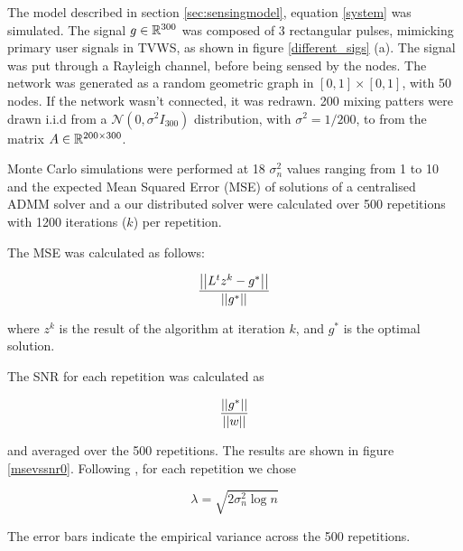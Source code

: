 The model described in section \eqref{sec:sensingmodel}, equation \eqref{system} was simulated. The signal \(g \in {\mathbb{R}}^{300} \) was composed of 3 rectangular pulses, mimicking primary user signals in TVWS, as shown in figure \eqref{different_sigs} (a). The signal was put through a Rayleigh channel, before being sensed by the nodes. The network was generated as a random geometric graph in \([0,1] \times [0,1]\), with 50 nodes. If the network wasn't connected, it was redrawn. 200 mixing patters were drawn i.i.d from a \(\mathcal{N}\left(0, \sigma^2 I_{300} \right) \) distribution, with \(\sigma^2 = 1/200\), to from the matrix \(A\in  {\mathbb{R}}^{200 \times 300}\).

Monte Carlo simulations were performed at 18 \(\sigma^2_n\) values ranging from 1 to 10 and the expected Mean Squared Error (MSE) of solutions of a centralised ADMM solver and a our distributed solver were calculated over 500 repetitions with 1200 iterations (\(k\)) per repetition.

The MSE was calculated as follows:

\begin{equation}
\frac{\left|\left|L^tz^k - g^*\right|\right|}{\left|\left|g^*\right|\right|}
\end{equation}

where \(z^k\) is the result of the algorithm at iteration \(k\), and \(g^*\) is the optimal solution.

The SNR for each repetition was calculated as

\begin{equation}
\frac{\left|\left|g^*\right|\right|}{\left|\left|w\right|\right|}
\end{equation}

and averaged over the 500 repetitions. The results are shown in figure \eqref{msevssnr0}. Following \cite{Chen1998}, for each repetition we chose 

\begin{equation}
\lambda = \sqrt{2\sigma^2_n\log{n}}
\end{equation}

The error bars indicate the empirical variance across the 500 repetitions.

